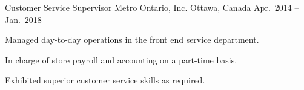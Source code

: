 

\begin{cventries}

  \cventry
    {Customer Service Supervisor} %
    {Metro Ontario, Inc.} %
    {Ottawa, Canada} %
    {Apr.~2014 -- Jan.~2018} %
    {
      \begin{cvitems} %
        \item Managed day-to-day operations in the front end service department.
        \item In charge of store payroll and accounting on a part-time basis.
        \item Exhibited superior customer service skills as required.
      \end{cvitems}
    }

\end{cventries}
